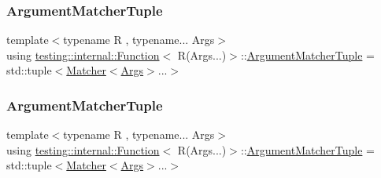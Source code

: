 \subsubsection{\texorpdfstring{ArgumentMatcherTuple}{ArgumentMatcherTuple}\hspace{0.1cm}{\footnotesize\ttfamily [1/2]}}
{\footnotesize\ttfamily template$<$typename R , typename... Args$>$ \\
using \mbox{\hyperlink{structtesting_1_1internal_1_1_function}{testing\+::internal\+::\+Function}}$<$ R(Args...)$>$\+::\mbox{\hyperlink{structtesting_1_1internal_1_1_function_3_01_r_07_args_8_8_8_08_4_aa1b4dca988b45fea2307518af5ac8a09}{Argument\+Matcher\+Tuple}} =  std\+::tuple$<$\mbox{\hyperlink{classtesting_1_1_matcher}{Matcher}}$<$\mbox{\hyperlink{namespacetesting_aaca153f67b689b8b9d5b8c67ecf8cee4}{Args}}$>$...$>$}

\mbox{\label{structtesting_1_1internal_1_1_function_3_01_r_07_args_8_8_8_08_4_aa1b4dca988b45fea2307518af5ac8a09}} 
\subsubsection{\texorpdfstring{ArgumentMatcherTuple}{ArgumentMatcherTuple}\hspace{0.1cm}{\footnotesize\ttfamily [2/2]}}
{\footnotesize\ttfamily template$<$typename R , typename... Args$>$ \\
using \mbox{\hyperlink{structtesting_1_1internal_1_1_function}{testing\+::internal\+::\+Function}}$<$ R(Args...)$>$\+::\mbox{\hyperlink{structtesting_1_1internal_1_1_function_3_01_r_07_args_8_8_8_08_4_aa1b4dca988b45fea2307518af5ac8a09}{Argument\+Matcher\+Tuple}} =  std\+::tuple$<$\mbox{\hyperlink{classtesting_1_1_matcher}{Matcher}}$<$\mbox{\hyperlink{namespacetesting_aaca153f67b689b8b9d5b8c67ecf8cee4}{Args}}$>$...$>$}

\mbox{\label{structtesting_1_1internal_1_1_function_3_01_r_07_args_8_8_8_08_4_afc6bddfcfc78f9308c268123ebc2a99b}} 
